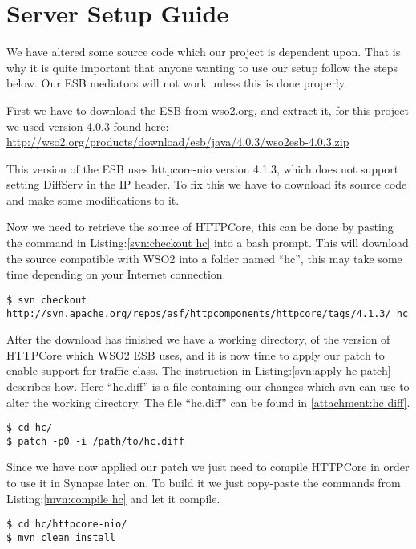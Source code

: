 \section{Server Setup Guide}\label{Server Setup Guide}
	\begin{shaded}
	We have altered some source code which our project is dependent upon. That is why it is quite important that anyone wanting to use our setup follow the steps below. Our ESB mediators will not work unless this is done properly.
	\end{shaded}

	First we have to download the ESB from wso2.org, and extract it, for this project we used version 4.0.3 found here:
\url{http://wso2.org/products/download/esb/java/4.0.3/wso2esb-4.0.3.zip}

	This version of the ESB uses httpcore-nio version 4.1.3, which does not support setting DiffServ in the IP header. To fix this we have to download its source code and make some modifications to it.

	Now we need to retrieve the source of HTTPCore, this can be done by pasting the command in Listing:\ref{svn:checkout hc} into a bash prompt. This will download the source compatible with WSO2 into a folder named “hc”, this may take some time depending on your Internet connection.
\lstset{language=bash}
\begin{lstlisting}[frame=single, caption={Checkout HttpCore source}, label=svn:checkout hc, breaklines=true]
$ svn checkout http://svn.apache.org/repos/asf/httpcomponents/httpcore/tags/4.1.3/ hc
\end{lstlisting}

	After the download has finished we have a working directory, of the version of HTTPCore which WSO2 ESB uses, and it is now time to apply our patch to enable support for traffic class. The instruction in Listing:\ref{svn:apply hc patch} describes how. Here “hc.diff” is a file containing our changes which svn can use to alter the working directory. The file “hc.diff” can be found in \ref{attachment:hc diff}.
\begin{lstlisting}[frame=single, caption={Apply HC patch}, label=svn:apply hc patch]
$ cd hc/
$ patch -p0 -i /path/to/hc.diff
\end{lstlisting}

	Since we have now applied our patch we just need to compile HTTPCore in order to use it in Synapse later on. To build it we just copy-paste the commands from Listing:\ref{mvn:compile hc} and let it compile.
\begin{lstlisting}[frame=single, caption={Build HttpCore-NIO}, label=mvn:compile hc, breaklines=true]
$ cd hc/httpcore-nio/
$ mvn clean install
\end{lstlisting}

